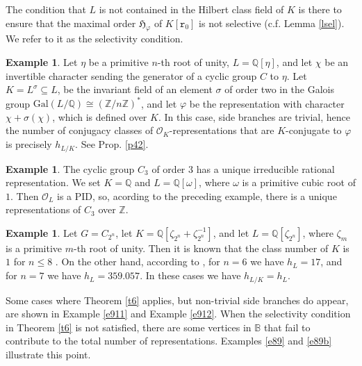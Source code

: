 \documentclass{article}
\theoremstyle{definition}
\newtheorem{ex}[Prop]{Example}
\theoremstyle{remark}
\begin{document}
The condition that $L$ is not contained in the Hilbert class 
field of $K$ is there to ensure that the maximal order 
$\mathfrak{H}_\varphi$ of $K[\mathtt{r}_0]$ is not selective 
(c.f. Lemma \ref{lsel}). We refer to it as the selectivity condition.

\begin{ex}
      Let $\eta$ be a primitive $n$-th root of unity, 
      $L=\mathbb{Q}[\eta]$, and let
      $\chi$ be an invertible character sending the generator
      of a cyclic group $C$ to $\eta$. 
      Let $K=L^{\sigma}\subseteq L$,
      be the invariant field of an element 
      $\sigma$ of order two in the
      Galois group $\mathrm{Gal}(L/\mathbb{Q})
      \cong(\mathbb{Z}/n\mathbb{Z})^*$, and let $\varphi$ 
      be the representation with character $\chi+\sigma(\chi)$,
      which is defined over $K$. In this case,
      side branches are trivial, hence the number of conjugacy 
      classes of $\mathcal{O}_K$-representations that are 
      $K$-conjugate to $\varphi$ is precisely $h_{L/K}$.
      See Prop. \ref{p42}.
\end{ex}

\begin{ex}
    The cyclic group $C_3$ of order $3$ has a 
    unique irreducible rational 
    representation. We set $K=\mathbb{Q}$ and 
    $L=\mathbb{Q}[\omega]$,
    where $\omega$ is a primitive cubic root of $1$. 
    Then $\mathcal{O}_L$
    is a PID, so, acording to the preceding example, there 
    is a unique representations of $C_3$ over $\mathbb{Z}$.
\end{ex}

\begin{ex}\label{e25}
    Let $G=C_{2^n}$, let 
    $K=\mathbb{Q}[\zeta_{2^n}+\zeta_{2^n}^{-1}]$,
    and let $L=\mathbb{Q}[\zeta_{2^n}]$, where $\zeta_m$
    is a primitive $m$-th root of unity. Then it is known
    that the class number of $K$ is $1$ for $n\leq 8$ \cite{Mill14}.
    On the other hand, according to \cite[p.353]{wik1}, 
    for $n=6$ we have $h_L=17$, and for $n=7$ we have 
    $h_L=359.057$. In these cases we have $h_{L/K}=h_L$.
\end{ex}

Some cases where Theorem \ref{t6} applies, but non-trivial
side branches do appear, are shown in Example \ref{e911}
and Example \ref{e912}.
When the selectivity condition in Theorem \ref{t6} is not
satisfied, there are some vertices in $\mathbb{B}$
that fail to contribute to the total number of 
representations. Examples \ref{e89} and \ref{e89b}
illustrate this point.
\end{document}
